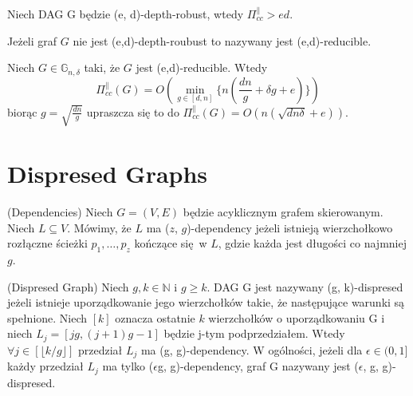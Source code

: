 \begin{theorem}
	Niech DAG G będzie (e, d)-depth-robust, wtedy $ \Pi_{ cc }^{ \parallel } > ed$.
\end{theorem}

\begin{definition}
	Jeżeli graf $G$ nie jest (e,d)-depth-roubust to nazywany jest (e,d)-reducible.
\end{definition}

\begin{theorem}
	Niech $G \in \mathbb{G}_{n, \delta}$ taki, że $G$ jest (e,d)-reducible. Wtedy
	$$ \Pi_{cc}^{\parallel}(G) = O \left( \min_{g \in [d,n]} \Big \lbrace n \left( \frac{dn}{g} + \delta g + e \right) \Big \rbrace \right) $$
	biorąc $g = \sqrt{ \frac{dn}{g}}$ upraszcza się to do $ \Pi_{cc}^{\parallel}(G) = O \left( n ( \sqrt{dn \delta} + e) \right)$.
\end{theorem}

\section{Dispresed Graphs}

\begin{definition}
	(Dependencies) Niech $G = (V, E)$ będzie acyklicznym grafem skierowanym.
	Niech $L \subseteq V$.
	Mówimy, że $L$ ma ($z$, $g$)-dependency jeżeli istnieją wierzchołkowo rozłączne ścieżki $p_{1}, \dots , p_{z}$ kończące się w $L$, gdzie każda jest długości co najmniej $g$.
\end{definition}

\begin{definition}
	(Dispresed Graph) Niech $g, k \in \mathbb{N}$ i $g \geq k$. DAG G jest nazywany (g, k)-dispresed jeżeli istnieje uporządkowanie jego wierzchołków takie, że następujące warunki są spełnione.
	Niech $[k]$ oznacza ostatnie $k$ wierzchołków o uporządkowaniu G i niech $L_{j} = [jg, (j + 1)g - 1]$ będzie j-tym podprzedziałem.
	Wtedy $\forall j \in [ \lfloor k / g \rfloor ]$ przedział $L_{j}$ ma (g, g)-dependency.
	W ogólności, jeżeli dla $ \epsilon \in (0, 1] $ każdy przedział $L_{j}$ ma tylko ($\epsilon$g, g)-dependency, graf G nazywany jest ($\epsilon$, g, g)-dispresed.
\end{definition}

